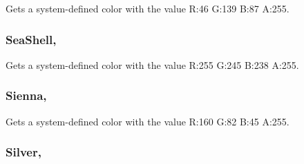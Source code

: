 Gets a system-\/defined color with the value R\+:46 G\+:139 B\+:87 A\+:255.

\hypertarget{structMicrosoft_1_1Xna_1_1Framework_1_1Color_af4680dab307b3f90e2547e23f5ad1fa3}{}
\subsubsection[{Sea\+Shell}]{ Sea\+Shell\hspace{0.3cm}{\ttfamily [static]}, {\ttfamily [get]}}\label{structMicrosoft_1_1Xna_1_1Framework_1_1Color_af4680dab307b3f90e2547e23f5ad1fa3}


Gets a system-\/defined color with the value R\+:255 G\+:245 B\+:238 A\+:255.

\hypertarget{structMicrosoft_1_1Xna_1_1Framework_1_1Color_a37a261d1a024bbc8fd49fdbe36ddd384}{}
\subsubsection[{Sienna}]{ Sienna\hspace{0.3cm}{\ttfamily [static]}, {\ttfamily [get]}}\label{structMicrosoft_1_1Xna_1_1Framework_1_1Color_a37a261d1a024bbc8fd49fdbe36ddd384}


Gets a system-\/defined color with the value R\+:160 G\+:82 B\+:45 A\+:255.

\hypertarget{structMicrosoft_1_1Xna_1_1Framework_1_1Color_a14d21c030d1e5a6cab3b87b34e035f73}{}
\subsubsection[{Silver}]{ Silver\hspace{0.3cm}{\ttfamily [static]}, {\ttfamily [get]}}\label{structMicrosoft_1_1Xna_1_1Framework_1_1Color_a14d21c030d1e5a6cab3b87b34e035f73}


